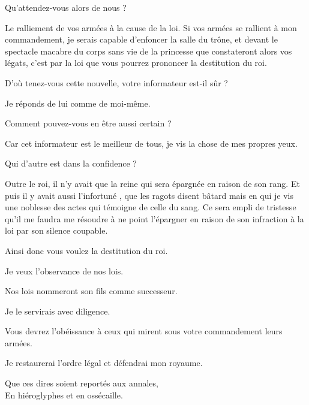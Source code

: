 \begin{drama}
  \nobleOnespeaks Qu’attendez-vous alors de nous ?

  \generalspeaks Le ralliement de vos armées à la cause de la loi. Si vos armées se rallient à mon commandement, je serais capable d’enfoncer la salle du trône, et devant le spectacle macabre du corps sans vie de la princesse que constateront alors vos légats, c’est par la loi que vous pourrez prononcer la destitution du roi.

  \nobleOnespeaks D’où tenez-vous cette nouvelle, votre informateur est-il sûr ?

  \generalspeaks Je réponds de lui comme de moi-même.

  \nobleTwospeaks Comment pouvez-vous en être aussi certain ?

  \generalspeaks Car cet informateur est le meilleur de tous, je vis la chose de mes propres yeux.

  \nobleOnespeaks Qui d’autre est dans la confidence ?

  \generalspeaks Outre le roi, il n’y avait que la reine qui sera épargnée en raison de son rang. Et puis il y avait aussi l’infortuné \elena{}, que les ragots disent bâtard mais en qui je vis une noblesse des actes qui témoigne de celle du sang. Ce sera empli de tristesse qu’il me faudra me résoudre à  ne point l’épargner en raison de son infraction à la loi par son silence coupable.

  \nobleOnespeaks Ainsi donc vous voulez la destitution du roi.

  \generalspeaks Je veux l’observance de nos lois.

  \nobleTwospeaks Nos lois nommeront son fils comme successeur.

  \generalspeaks Je le servirais avec diligence.

  \nobleTreespeaks Vous devrez l’obéissance à ceux qui mirent sous votre commandement leurs armées.

  \generalspeaks Je restaurerai l’ordre légal et défendrai mon royaume.

  \begin{minipage}[t]{\linewidth}
    Que ces dires soient reportés aux annales,\\
    En hiéroglyphes et en ossécaille.
  \end{minipage}

\end{drama}

\scene

\StageDirII{\elena, \vladimir}

